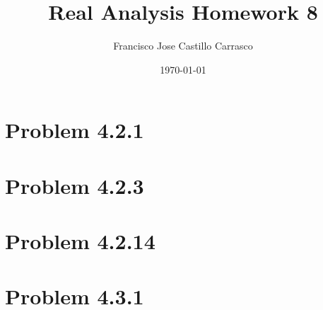 




\title{Real Analysis Homework 8}
\author{Francisco Jose Castillo Carrasco}
\date{\today}
\maketitle




\section{Problem 4.2.1}


\section{Problem 4.2.3}


\section{Problem 4.2.14}


\section{Problem 4.3.1}






